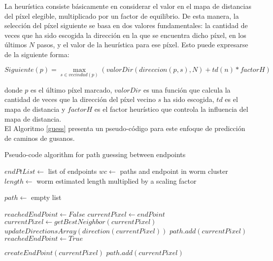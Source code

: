 La heur\'istica consiste b\'asicamente en considerar el valor en el mapa de distancias
del p\'ixel elegible, multiplicado por un factor de equilibrio. De esta manera, la 
selecci\'on del p\'ixel siguiente se basa en dos valores fundamentales: la cantidad
de veces que ha sido escogida la direcci\'on en la que se encuentra dicho p\'ixel, 
en los \'ultimos $N$ pasos, y el valor de la heur\'istica para ese p\'ixel. Esto
puede expresarse de la siguiente forma:

$$Siguiente(p) = \max_{s \in vecindad(p)} (valorDir(direccion(p,s),N) + td(n)*factorH)$$

donde $p$ es el \'ultimo p\'ixel marcado, $valorDir$ es una funci\'on que calcula
la cantidad de veces que la direcci\'on del p\'ixel vecino $s$ ha sido escogida, $td$ es el 
mapa de distancia y $factorH$ es el factor heur\'istico que controla la influencia 
del mapa de distancia.\\


El Algoritmo \ref{guess} presenta un pseudo-c\'odigo para este enfoque de predicci\'on
de caminos de gusanos.

\begin{algorithm}[h]                    
\caption{Pseudo-code algorithm for path guessing between endpoints}         
\label{guess}                    
\begin{algorithmic}                   

\STATE $endPtList \leftarrow$ list of endpoints
\STATE $wc \leftarrow$ paths and endpoint in worm cluster 
\STATE $length \leftarrow$ worm estimated length multiplied by a scaling factor
\STATE {}
\ENDIF
{}

\STATE $path \leftarrow$ empty list

\STATE $reachedEndPoint \leftarrow False$
\STATE $currentPixel \leftarrow endPoint$
\STATE $currentPixel \leftarrow getBestNeighbor(currentPixel)$
\STATE $updateDirectionsArray(direction(currentPixel))$
\STATE $path.add(currentPixel)$
\STATE $reachedEndPoint \leftarrow True$
\ENDIF
\ENDWHILE 

\STATE $createEndPoint(currentPixel)$
\STATE $path.add(currentPixel)$
\ELSE
\STATE {}
\ENDIF
\ENDIF
\ENDFOR

\end{algorithmic}
\end{algorithm}


